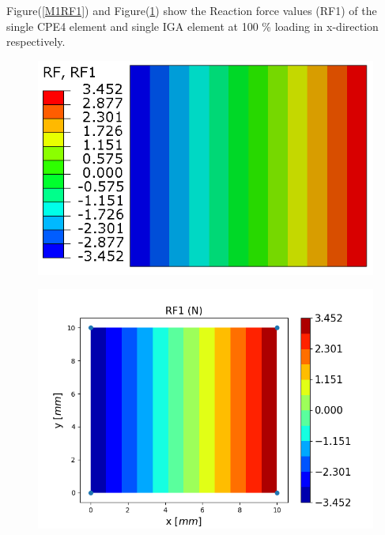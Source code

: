 \documentclass[11pt]{article}
\begin{document}
Figure(\ref{M1RF1}) and Figure(\ref{M1RF1_IGA}) show the Reaction force values (RF1) of the single CPE4 element and single IGA element at 100 \% loading in x-direction respectively. \\
\begin{figure}[H]
	\centering
	\begin{minipage}{.5\textwidth}
		\centering
		\includegraphics[width=1\linewidth]{M1RF1.png}
		\label{M1RF1}
	\end{minipage}%
	\begin{minipage}{.65\textwidth}
		\centering
		\includegraphics[width=1\linewidth]{M1RF1_IGA.png}
		\label{M1RF1_IGA}
	\end{minipage}
\end{figure}
\end{document}

